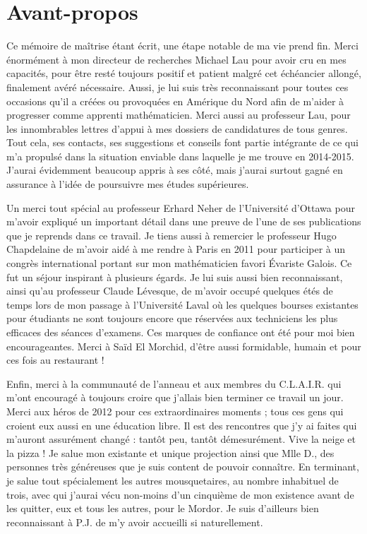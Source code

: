 \chapter*{Avant-propos}         %

Ce mémoire de maîtrise étant écrit, une étape notable de ma vie prend fin. Merci énormément à mon directeur de recherches Michael Lau pour avoir cru en mes capacités, pour être resté toujours positif et patient malgré cet échéancier allongé, finalement avéré nécessaire. Aussi, je lui suis très reconnaissant pour toutes ces occasions qu'il a créées ou provoquées en Amérique du Nord afin de m'aider à progresser comme apprenti mathématicien. Merci aussi au professeur Lau, pour les innombrables lettres d'appui à mes dossiers de candidatures de tous genres. Tout cela, ses contacts, ses suggestions et conseils font partie intégrante de ce qui m'a propulsé dans la situation enviable dans laquelle je me trouve en 2014-2015. J'aurai évidemment beaucoup appris à ses côté, mais j'aurai surtout gagné en assurance à l'idée de poursuivre mes études supérieures.

Un merci tout spécial au professeur Erhard Neher de l'Université d'Ottawa pour m'avoir expliqué un important détail dans une preuve de l'une de ses publications que je reprends dans ce travail. Je tiens aussi à remercier le professeur Hugo Chapdelaine de m'avoir aidé à me rendre à Paris en 2011 pour participer à un congrès international portant sur mon mathématicien favori Évariste Galois. Ce fut un séjour inspirant à plusieurs égards. Je lui suis aussi bien reconnaissant, ainsi qu'au professeur Claude Lévesque, de m'avoir occupé quelques étés de temps lors de mon passage à l'Université Laval où les quelques bourses existantes pour étudiants ne sont toujours encore que réservées aux techniciens les plus efficaces des séances d'examens. Ces marques de confiance ont été pour moi bien encourageantes. Merci à Saïd El Morchid, d'être aussi formidable, humain et pour ces fois au restaurant !

Enfin, merci à la communauté de l'anneau et aux membres du C.L.A.I.R. qui m'ont encouragé à toujours croire que j'allais bien terminer ce travail un jour. Merci aux héros de 2012 pour ces extraordinaires moments ; tous ces gens qui croient eux aussi en une éducation libre. Il est des rencontres que j'y ai faites qui m'auront assurément changé : tantôt peu, tantôt démesurément. Vive la neige et la pizza ! Je salue mon existante et unique projection ainsi que Mlle D., des personnes très généreuses que je suis content de pouvoir connaître. En terminant, je salue tout spécialement les autres mousquetaires, au nombre inhabituel de trois, avec qui j'aurai vécu non-moins d'un cinquième de mon existence avant de les quitter, eux et tous les autres, pour le Mordor. Je suis d'ailleurs bien reconnaissant à P.J. de m'y avoir accueilli si naturellement.